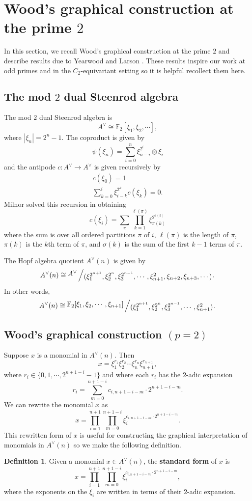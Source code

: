 \documentclass{amsart}
\theoremstyle{definition}
\newtheorem{deff}[theorem]{Definition}
\theoremstyle{plain}
\numberwithin{theorem}{section}
\numberwithin{equation}{section}
\numberwithin{figure}{section}
\newcommand{\mF}{{\mathbb F}}
\newcommand{\0}{\langle 0 \rangle }
\newcommand{\bigslant}[2]{{\raisebox{.2em}{$#1$}\left/\raisebox{-.2em}{$#2$}\right.}}
\begin{document}
\section{Wood's graphical construction at the prime $2$} \label{sec:Woodp=2}

In this section, we recall Wood's graphical construction at the prime $2$ and describe results due to Yearwood \cite{Yearwood19} and Larson \cite{Larson22}. These results inspire our work at odd primes and in the $C_2$-equivariant setting so it is helpful recollect them here.

\subsection{The mod $2$ dual Steenrod algebra}

The mod $2$ dual Steenrod algebra is 
\[
A^\vee \cong \mF_2 [ \xi_1, \xi_2, \cdots],
\]
where $| \xi_n | = 2^n - 1$. The coproduct is given by 
\[
\psi(\xi_n) = \sum_{i=0}^n \xi_{n-i}^{2^i} \otimes \xi_i
\]
and the antipode $c: A^\vee \to A^\vee$ is given recursively by 
\begin{align*}
    c(\xi_0) = 1 \\
    \sum_{k=0}^i \xi_{i-k}^{2^k} c(\xi_k) = 0.
\end{align*}
 Milnor solved this recursion in \cite[Lemma 10]{Milnor58} obtaining
\[
c(\xi_i) = \sum_\pi \prod_{k=1}^{\ell(\pi)} \xi_{\pi(k)}^{2^{\sigma(k)}}
\]
where the sum is over all ordered partitions $\pi$ of $i$, $\ell(\pi)$ is the length of $\pi$, $\pi(k)$ is the $k$th term of $\pi$, and $\sigma(k)$ is the sum of the first $k-1$ terms of $\pi$.

The Hopf algebra quotient $A^\vee(n)$ is given by 
\[
A^\vee (n) \cong \bigslant{A^\vee}{(\xi_1^{2^{n + 1}}, \xi_2^{2^n}, \xi_3^{2^{n-1}}, \cdots, \xi_{n + 1}^2, \xi_{n + 2}, \xi_{n + 3}, \cdots)}.
\]
In other words, 
\[
A^\vee(n) \cong \bigslant{\mF_2 [ \xi_1, \xi_2, \cdots, \xi_{n + 1}]}{(\xi_1^{2^{n + 1}}, \xi_2^{2^n}, \xi_3^{2^{n-1}}, \cdots, \xi_{n + 1}^2)}.
\]

\subsection{Wood's graphical construction $(p = 2)$} 
Suppose $x$ is a monomial in $A^\vee(n)$. Then 
\[
x = \xi_1^{r_1} \xi_2^{r_2} \cdots \xi_n^{r_n} \xi_{n + 1}^{r_{n + 1}},
\]
where $r_i \in \{0,1, \cdots, 2^{n + 1 - i}-1 \}$ and where each $r_i$ has the $2$-adic expansion
\[
r_i = \sum_{m=0}^{n + 1-i} c_{i,n+ 1-i-m} \cdot 2^{n+ 1-i-m}.
\]
We can rewrite the monomial $x$ as 
\[
x = \prod_{i=1}^{n + 1} \prod_{m = 0}^{{n+1-i}} \xi_i^{c_{i, n + 1 - i - m} \cdot 2^{n + 1 - i - m}}.
\]
This rewritten form of $x$ is useful for constructing the graphical interpretation of monomials in $A^\vee (n)$ so we make the following definition.
\begin{deff}\label{sform1}
    Given  a monomial \color{black} $x \in A^\vee (n)$, the \textbf{standard form} of $x$ is 
    \[
x = \prod_{i=1}^{n + 1} \prod_{m = 0}^{{n+1-i}}\xi_i^{c_{i, n + 1 - i - m} \cdot 2^{n + 1 - i - m}},
\]
where the exponents on the $\xi_i$ are written in terms of their $2$-adic expansion. 
\end{deff}
\end{document}

